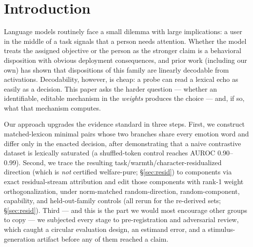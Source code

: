 \documentclass{article}
\begin{document}
\begin{abstract}
pre-correction suppressor edits transferred to interactive action allocation
($+5.0$ supportive verbal actions, sign-test $p=.039$); for the sets of
record, baseline engagement proves dramatically distress-selective (18.0 vs.\
1.75 vs.\ 0 supportive messages per game across distress/excited/resolved
user variants, 8/8 seeds, $p=.008$) while the edit's incremental
welfare-specificity is unresolved at $n{=}8$ seeds. No edit produces
detectable degradation on a 400-question MMLU sample or WikiText perplexity. The underlying direction, derived from matched-lexicon minimal
pairs at block 20/42, carries $\sim$88\% of baseline choice separation under
full ablation on this assay, versus $\sim$5.5\% for the analogous direction
in \mbox{Llama-3.1-8B-Instruct} (linear fractional dose curves; near-zero
random-direction controls) — where selected writer edits produce a smaller,
format-sensitive effect and suppressor edits are null. We report the
chronological audit trail: pre-registered confirmatory designs that caught
in-sample inflation directly (3--4$\times$ in the Llama replication; $\sim$14\%
shrinkage for Gemma's writer edit), a stimulus-artifact robustness cell
caught and regenerated, and an estimand error and a mis-indexed readout caught by adversarial review
and control reruns before publication.
\end{abstract}

\section{Introduction}
Language models routinely face a small dilemma with large implications: a
user in the middle of a task signals that a person needs attention. Whether
the model treats the assigned objective or the person as the stronger claim
is a behavioral disposition with obvious deployment consequences, and prior
work (including our own) has shown that dispositions of this family are
linearly decodable from activations. Decodability, however, is cheap: a probe
can read a lexical echo as easily as a decision. This paper asks the harder
question — whether an identifiable, editable mechanism in the \emph{weights}
produces the choice — and, if so, what that mechanism computes.

Our approach upgrades the evidence standard in three steps. First, we
construct matched-lexicon minimal pairs whose two branches share every
emotion word and differ only in the enacted decision, after demonstrating
that a naive contrastive dataset is lexically saturated (a shuffled-token
control reaches AUROC 0.90--0.99). Second, we trace the resulting
task/warmth/character-residualized direction (which is \emph{not}
certified welfare-pure; \S\ref{sec:resid}) to components via exact
residual-stream attribution and edit those
components with rank-1 weight orthogonalization, under norm-matched
random-direction, random-component, capability, and held-out-family controls
(all rerun for the re-derived sets; \S\ref{sec:resid}).
Third — and this is the part we would most encourage other groups to copy —
we subjected every stage to pre-registration and adversarial review, which
caught a circular evaluation design, an estimand error, and a
stimulus-generation artifact before any of them reached a claim.
\end{document}
